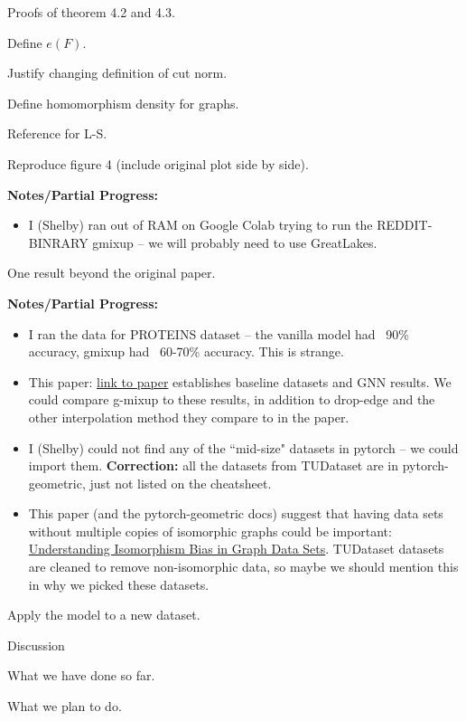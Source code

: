 \documentclass[12pt]{amsart}
\begin{document}
\begin{enumerate}
    \begin{todolist}
        \item Proofs of theorem 4.2 and 4.3.
        \begin{todolist}
            \item Define $e(F)$.
            \item Justify changing definition of cut norm.
            \item Define homomorphism density for graphs.
            \item Reference for L-S.
        \end{todolist}
        \item Reproduce figure 4 (include original plot side by side).

        \textbf{Notes/Partial Progress:} 

        \begin{itemize}
            \item I (Shelby) ran out of RAM on Google Colab trying to run the REDDIT-BINRARY gmixup -- we will probably need to use GreatLakes.
        \end{itemize}
    \end{todolist}
    \item One result beyond the original paper.
    
    \textbf{Notes/Partial Progress:}
    \begin{itemize}
        \item I ran the data for PROTEINS dataset -- the vanilla model had ~90\% accuracy, gmixup had ~60-70\% accuracy. This is strange.
        \item This paper: \href{https://grlplus.github.io/papers/79.pdf}{link to paper} establishes baseline datasets and GNN results. We could compare g-mixup to these results, in addition to drop-edge and the other interpolation method they compare to in the paper.
        \item I (Shelby) could not find any of the ``mid-size" datasets in pytorch -- we could import them. \textbf{Correction:} all the datasets from TUDataset are in pytorch-geometric, just not listed on the cheatsheet.
        \item This paper (and the pytorch-geometric docs) suggest that having data sets without multiple copies of isomorphic graphs could be important: \href{https://arxiv.org/abs/1910.12091}{Understanding Isomorphism Bias in Graph Data Sets}. TUDataset datasets are cleaned to remove non-isomorphic data, so maybe we should mention this in why we picked these datasets.
    \end{itemize}
    \begin{todolist}
        \item Apply the model to a new dataset.
    \end{todolist}
    \item Discussion
    \begin{todolist}
        \item What we have done so far.
        \item What we plan to do.
    \end{todolist}
\end{enumerate}
\end{document}
